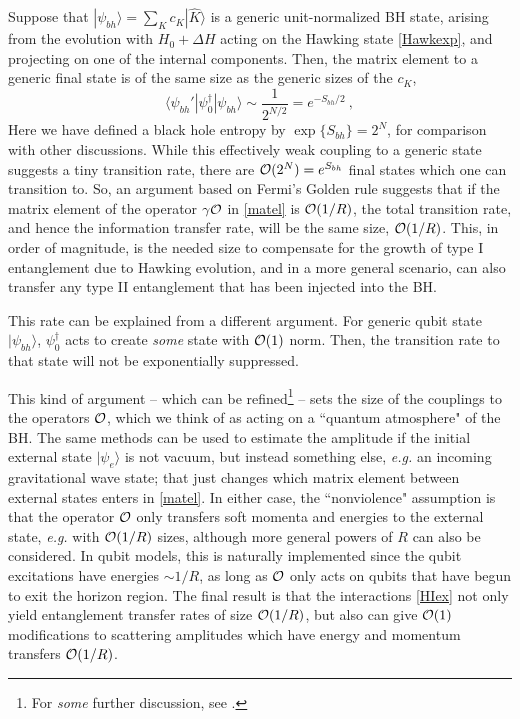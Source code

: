 \documentclass[12pt]{article}
\numberwithin{equation}{section}
\newcommand{\calo}{{\cal O}}
\newcommand{\beq}{\begin{equation}}
\newcommand{\eeq}{\end{equation}}
\begin{document}
Suppose that $|\psi_{bh}\rangle=\sum_K c_K |\hat K\rangle$ is a generic unit-normalized BH state, arising from the evolution with $H_0+\Delta H$ acting on the Hawking state \eqref{Hawkexp}, and projecting on one of the internal components.  Then, the matrix element to a generic final state is of the same size as the generic sizes of the $c_K$,
\beq
\langle\psi_{bh}'| \psi_0^\dagger |\psi_{bh}\rangle \sim \frac{1}{2^{N/2}}=e^{-S_{bh}/2}\ ,
\eeq
Here we have defined a black hole entropy by $\exp\{S_{bh}\}=2^N$, for comparison with other discussions.  While this effectively weak coupling to a generic state suggests  a tiny transition rate, there are $\calo(2^N)=e^{S_{bh}}$ final states which one can transition to.  So, an argument based on Fermi's Golden rule\cite{NVU} suggests that if the matrix element of the operator $\gamma \calo$ in \eqref{matel} is $\calo(1/R)$, the total transition rate, and hence the information transfer rate, will be the same size, $\calo(1/R)$.  This, in order of magnitude, is the needed size to compensate for the growth of type I entanglement due to Hawking evolution, and in a more general scenario, can also transfer any type II entanglement that has been injected into the BH.

This rate can be explained from a different argument.  For generic qubit state $|\psi_{bh}\rangle$, $\psi_0^\dagger$ acts to create {\it some} state with $\calo(1)$ norm.  Then, the transition rate to that state will not be exponentially suppressed.

This kind of argument -- which can be refined\footnote{For {\it some} further discussion, see \cite{GiRo}.} -- sets the size of the couplings to the operators $\calo$, which we think of as acting on a ``quantum atmosphere" of the BH.  The same methods can be used to estimate the amplitude if the initial external state $|\psi_e\rangle$ is not vacuum, but instead something else, {\it e.g.} an incoming gravitational wave state\cite{BHQU}; that just changes which matrix element between external states enters in \eqref{matel}.  In either case, the ``nonviolence" assumption\cite{SGmodels,NVNL,NVUEFT,NVNLT,NVU,BHQU} is that the operator $\calo$ only transfers soft momenta and energies to the external state, {\it e.g.} with $\calo(1/R)$ sizes, although more general powers of $R$ can also be considered.  In qubit models, this is naturally implemented since the qubit excitations have energies $\sim 1/R$, as long as $\calo$ only acts on qubits that have begun to exit the horizon region.  The final result is that the interactions \eqref{HIex} not only yield entanglement transfer rates of size $\calo(1/R)$, but also 
can give $\calo(1)$ modifications to scattering amplitudes which have energy and momentum transfers $\calo(1/R)$.  
\end{document}

